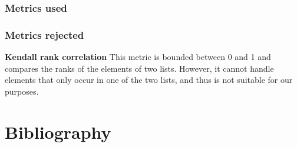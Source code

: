 \documentclass{article}
\begin{document}
\subsubsection{Metrics used}

\subsubsection{Metrics rejected}
\begin{description}
    \item \textbf{Kendall rank correlation} This metric is bounded between 0 and 1 and compares the ranks of the elements of two lists. However, it cannot handle elements that only occur in one of the two lists, and thus is not suitable for our purposes.
    \item \textbf{}
\end{description}



\section{Bibliography}


\end{document}
